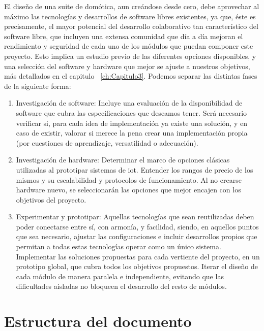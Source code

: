 El diseño de una suite de domótica, aun creándose desde cero, debe aprovechar al máximo las tecnologías y desarrollos de software libres existentes, ya que, éste es precisamente, el mayor potencial del desarrollo colaborativo tan característico del software libre, que incluyen una extensa comunidad que día a día mejoran el rendimiento y seguridad de cada uno de los módulos que puedan componer este proyecto. Esto implica un estudio previo de las diferentes opciones disponibles, y una selección del software y hardware que mejor se ajuste a nuestros objetivos, más detallados en el capitulo ~\ref{ch:Capitulo3}. Podemos separar las distintas fases de la siguiente forma:

\begin{enumerate}
  \item Investigación de software: Incluye una evaluación de la disponibilidad de software que cubra las especificaciones que deseamos tener. Será necesario verificar si, para cada idea de implementación ya existe una solución, y en caso de existir, valorar si merece la pena crear una implementación propia (por cuestiones de aprendizaje, versatilidad o adecuación).

  \item Investigación de hardware: Determinar el marco de opciones clásicas utilizadas al prototipar sistemas de \gls{iot}. Entender los rangos de precio de los mismos y su escalabilidad y protocolos de funcionamiento. Al no crearse hardware nuevo, se seleccionarán las opciones que mejor encajen con los objetivos del proyecto.

  \item Experimentar y prototipar: Aquellas tecnologías que sean reutilizadas deben poder conectarse entre sí, con armonía, y facilidad, siendo, en aquellos puntos que sea necesario, ajustar las configuraciones e incluir desarrollos propios que permitan a todas estas tecnologías operar como un único sistema. Implementar las soluciones propuestas para cada vertiente del proyecto, en un prototipo global, que cubra todos los objetivos propuestos. Iterar el diseño de cada módulo de manera paralela e independiente, evitando que las dificultades aisladas no bloqueen el desarrollo del resto de módulos.

\end{enumerate}

\section{Estructura del documento}
\label{ch:Capitulo1.3}

